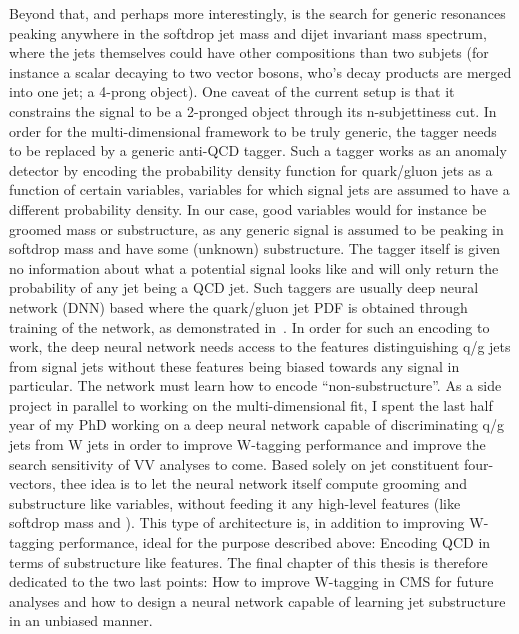 Beyond that, and perhaps more interestingly, is the search for generic resonances peaking anywhere in the softdrop jet mass and dijet invariant mass spectrum, where the jets themselves could have other compositions than two subjets (for instance a scalar decaying to two vector bosons, who's decay products are merged into one jet; a 4-prong object). One caveat of the current setup is that it constrains the signal to be a 2-pronged object through its n-subjettiness cut. In order for the multi-dimensional framework to be truly generic, the tagger needs to be replaced by a generic anti-QCD tagger. Such a tagger works as an anomaly detector by encoding the probability density function for quark/gluon jets as a function of certain variables, variables for which signal jets are assumed to have a different probability density.
In our case, good variables would for instance be groomed mass or substructure, as any generic signal is assumed to be peaking in softdrop mass and have some (unknown) substructure. The tagger itself is given no information about what a potential signal looks like and will only return the probability of any jet being a QCD jet. Such taggers are usually deep neural network (DNN) based where the quark/gluon jet PDF is obtained through training of the network, as demonstrated in~\cite{Heimel:2018mkt,Aguilar-Saavedra:2017rzt}.\newline
In order for such an encoding to work, the deep neural network needs access to the features distinguishing q/g jets from signal jets without these features being biased towards any signal in particular. The network must learn how to encode ``non-substructure''.\newline
As a side project in parallel to working on the multi-dimensional fit, I spent the last half year of my PhD working on a deep neural network capable of discriminating q/g jets from W jets in order to improve W-tagging performance and improve the search sensitivity of VV analyses to come. Based solely on jet constituent four-vectors, thee idea is to let the neural network itself compute grooming and substructure like variables, without feeding it any high-level features (like softdrop mass and \nsubj). 
This type of architecture is, in addition to improving W-tagging performance, ideal for the purpose described above: Encoding QCD in terms of substructure like features. The final chapter of this thesis is therefore dedicated to the two last points: How to improve W-tagging in CMS for future analyses and how to design a neural network capable of learning jet substructure in an unbiased manner.  
\clearpage

